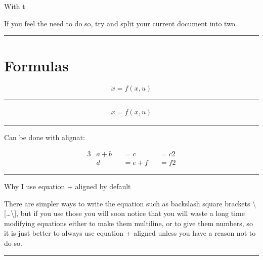 \documentclass[12pt]{article}
\newcommand{\inOut}[1]{#1}                                %
\begin{document}
                    \begin{remark} \label{remSec1}
                        With t

                        If you feel the need to do so, try and split your current document into two.
                    \end{remark}\hrule

\section{Formulas}\label{secForm}

    \begin{example} \label{expFor2}

        \inOut{
            \begin{equation*}\label{eqFor2}
                \dot{x} = f(x,u)
            \end{equation*}
        }

    \end{example}\hrule

    \begin{example} \label{expFor1}

        \inOut{
            \begin{equation}\begin{aligned}\label{eqFor1}
                \dot{x} = f(x,u)
            \end{aligned}\end{equation}
        }

    \end{example}\hrule

    \begin{example} \label{alignMult}

        Can be done with alignat:

        \inOut{
            \begin{alignat*}{3}
                & a + b && = c      && = c2 \\
                & d     && = e + f  && = f2
            \end{alignat*}
        }

    \end{example}\hrule

    \begin{remark}\label{remFor1} Why I use equation + aligned by default

        There are simpler ways to write the equation such as backslash square brackets \textbackslash{}[\ldots\textbackslash{}],
        but if you use those you will soon notice that you will waste a long time modifying equations
        either to make them multiline, or to give them numbers, so it is just better to always use
        equation + aligned unless you have a reason not to do so.

    \end{remark}\hrule
\end{document}

